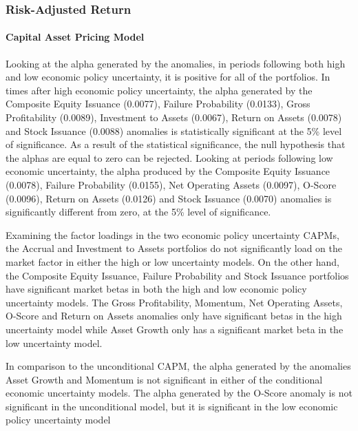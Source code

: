 \documentclass[a4paper]{article}                 %
\begin{document}
\subsubsection{Risk-Adjusted Return}
\paragraph{Capital Asset Pricing Model}
Looking at the alpha generated by the anomalies, in periods following both high and low economic policy uncertainty, it is positive for all of the portfolios. In times after high economic policy uncertainty, the alpha generated by the Composite Equity Issuance (0.0077), Failure Probability (0.0133), Gross Profitability (0.0089), Investment to Assets (0.0067), Return on Assets (0.0078) and Stock Issuance (0.0088) anomalies is statistically significant at the 5\% level of significance. As a result of the statistical significance, the null hypothesis that the alphas are equal to zero can be rejected. Looking at periods following low economic uncertainty, the alpha produced by the Composite Equity Issuance (0.0078), Failure Probability (0.0155), Net Operating Assets (0.0097), O-Score (0.0096), Return on Assets (0.0126) and Stock Issuance (0.0070) anomalies is significantly different from zero, at the 5\% level of significance. 

Examining the factor loadings in the two economic policy uncertainty CAPMs, the Accrual and Investment to Assets portfolios do not significantly load on the market factor in either the high or low uncertainty models. On the other hand, the Composite Equity Issuance, Failure Probability and Stock Issuance portfolios have significant market betas in both the high and low economic policy uncertainty models. The Gross Profitability, Momentum, Net Operating Assets, O-Score and Return on Assets anomalies only have significant betas in the high uncertainty model while Asset Growth only has a significant market beta in the low uncertainty model.

In comparison to the unconditional CAPM, the alpha generated by the anomalies Asset Growth and Momentum is not significant in either of the conditional economic uncertainty models. The alpha generated by the O-Score anomaly is not significant in the unconditional model, but it is significant in the low economic policy uncertainty model
\end{document}
